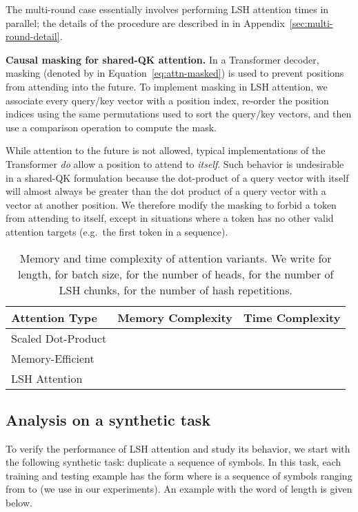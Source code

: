 \documentclass{article} \usepackage{iclr2020_conference,times}
\renewcommand{\paragraph}[1]{\textbf{#1}}
\begin{document}
The multi-round case essentially involves performing LSH attention  times in parallel; the details of the procedure are described in in Appendix~\ref{sec:multi-round-detail}.

\paragraph{Causal masking for shared-QK attention.}
In a Transformer decoder, masking (denoted by  in Equation~\ref{eq:attn-masked}) is used to prevent positions from attending into the future. To implement masking in LSH attention, we associate every query/key vector with a position index, re-order the position indices using the same permutations used to sort the query/key vectors, and then use a comparison operation to compute the mask.

While attention to the future is not allowed, typical implementations of the Transformer \emph{do} allow a position to attend to \emph{itself}. Such behavior is undesirable in a shared-QK formulation because the dot-product of a query vector with itself will almost always be greater than the dot product of a query vector with a vector at another position. We therefore modify the masking to forbid a token from attending to itself, except in situations where a token has no other valid attention targets (e.g.\ the first token in a sequence).

\begin{table}
\caption{Memory and time complexity of attention variants.
  We write  for length,  for batch size,  for the number of heads,
   for the number of LSH chunks,  for the number of hash repetitions.}
\label{tab:complexity}
\begin{center}
\begin{tabular}{lcc}
Attention Type & Memory Complexity & Time Complexity  \\
\hline
Scaled Dot-Product &  &  \\
Memory-Efficient &  &  \\
LSH Attention &  &  \\
\end{tabular}
\end{center}
\end{table}


\subsection{Analysis on a synthetic task}

To verify the performance of LSH attention and study its behavior,
we start with the following synthetic task: duplicate a sequence
of symbols. In this task, each training and testing example has
the form  where  is a sequence of
symbols ranging from  to  (we use  in our experiments).
An example with the word  of length  is given below.
\end{document}
